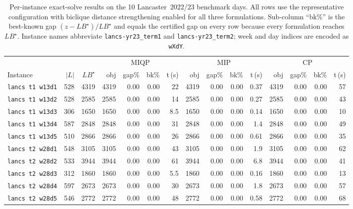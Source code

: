 \documentclass[11pt]{article}
\begin{document}
\begin{table}[ht]
\centering
\scriptsize
\setlength{\tabcolsep}{2pt}
\begin{tabular}{@{}lrr rrrr rrrr rrrr@{}}
\hline
 & & & \multicolumn{4}{c}{MIQP} & \multicolumn{4}{c}{MIP} & \multicolumn{4}{c}{CP} \\
Instance & $|L|$ & $LB^\star$ & obj & gap\% & bk\% & t\,(s) & obj & gap\% & bk\% & t\,(s) & obj & gap\% & bk\% & t\,(s) \\
\hline
\texttt{lancs t1 w13d1} & 528 & 4319 & 4319 & 0.00 & 0.00 & 22 & 4319 & 0.00 & 0.00 & 0.37 & 4319 & 0.00 & 0.00 & 57 \\
\texttt{lancs t1 w13d2} & 528 & 2585 & 2585 & 0.00 & 0.00 & 14 & 2585 & 0.00 & 0.00 & 0.27 & 2585 & 0.00 & 0.00 & 43 \\
\texttt{lancs t1 w13d3} & 306 & 1650 & 1650 & 0.00 & 0.00 & 8.5 & 1650 & 0.00 & 0.00 & 0.14 & 1650 & 0.00 & 0.00 & 10 \\
\texttt{lancs t1 w13d4} & 587 & 2848 & 2848 & 0.00 & 0.00 & 31 & 2848 & 0.00 & 0.00 & 1.4 & 2848 & 0.00 & 0.00 & 49 \\
\texttt{lancs t1 w13d5} & 510 & 2866 & 2866 & 0.00 & 0.00 & 26 & 2866 & 0.00 & 0.00 & 0.61 & 2866 & 0.00 & 0.00 & 35 \\
\texttt{lancs t2 w28d1} & 548 & 3105 & 3105 & 0.00 & 0.00 & 43 & 3105 & 0.00 & 0.00 & 1.9 & 3105 & 0.00 & 0.00 & 62 \\
\texttt{lancs t2 w28d2} & 533 & 3944 & 3944 & 0.00 & 0.00 & 61 & 3944 & 0.00 & 0.00 & 6.8 & 3944 & 0.00 & 0.00 & 41 \\
\texttt{lancs t2 w28d3} & 312 & 1860 & 1860 & 0.00 & 0.00 & 5.5 & 1860 & 0.00 & 0.00 & 0.16 & 1860 & 0.00 & 0.00 & 13 \\
\texttt{lancs t2 w28d4} & 597 & 2673 & 2673 & 0.00 & 0.00 & 30 & 2673 & 0.00 & 0.00 & 1.8 & 2673 & 0.00 & 0.00 & 57 \\
\texttt{lancs t2 w28d5} & 546 & 2772 & 2772 & 0.00 & 0.00 & 48 & 2772 & 0.00 & 0.00 & 0.58 & 2772 & 0.00 & 0.00 & 68 \\
\hline
\end{tabular}
\caption{Per-instance exact-solve results on the 10 Lancaster~2022/23 benchmark
days. All rows use the representative configuration with biclique distance
strengthening enabled for all three formulations. Sub-column ``bk\%'' is the
best-known gap $(z-LB^\star)/LB^\star$ and equals the certified gap on every
row because every formulation reaches $LB^\star$. Instance names abbreviate
\texttt{lancs-yr23\_term1} and \texttt{lancs-yr23\_term2}; week and day
indices are encoded as \texttt{wXdY}.}
\label{tab:app-exact-lan}
\end{table}
\end{document}
